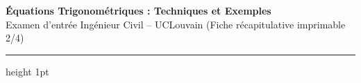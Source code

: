 \newpage
\thispagestyle{plain}

\begin{center}
    {\LARGE\bfseries\color{uclblue} Équations Trigonométriques : Techniques et Exemples}\\[2pt]
    {\small\color{darkgray} Examen d'entrée Ingénieur Civil -- UCLouvain (Fiche récapitulative imprimable 2/4)}
    \vspace{2pt}
    \hrule height 1pt
\end{center}
\vspace{-6pt}

